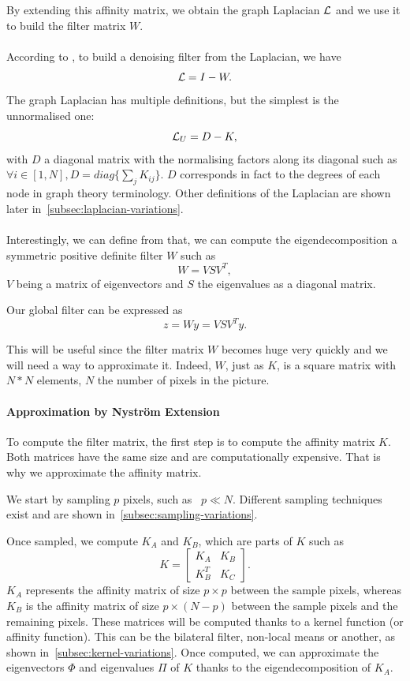 By extending this affinity matrix, we obtain the graph Laplacian \(\operatorname{\mathcal{L}}\) and we use it to build the filter matrix \(W\).

\paragraph{}
According to \cite{modern_tour_2013}, to build a denoising filter from the Laplacian, we have
\[\operatorname{\mathcal{L}} = I - W.\]
The graph Laplacian has multiple definitions, but the simplest is the unnormalised one:
\[\operatorname{\mathcal{L}}_U = D - K,\]
with \(D\) a diagonal matrix with the normalising factors along its diagonal such as \(\forall i \in [1, N], D = diag\{\sum_j K_{ij}\}\).
\(D\) corresponds in fact to the degrees of each node in graph theory terminology.
Other definitions of the Laplacian are shown later in~\ref{subsec:laplacian-variations}.

\paragraph{}
Interestingly, we can define from \cite{glide_2014} that, we can compute the eigendecomposition a symmetric positive definite filter \(W\) such as
\[W = VSV^T,\]
\(V\) being a matrix of eigenvectors and \(S\) the eigenvalues as a diagonal matrix.

Our global filter can be expressed as
\[z = Wy = VSV^Ty.\]

This will be useful since the filter matrix \(W\) becomes huge very quickly and we will need a way to approximate it.
Indeed, \(W\), just as \(K\), is a square matrix with \(N*N\) elements, \(N\) the number of pixels in the picture.

\paragraph{Approximation by Nystr\"om Extension}

To compute the filter matrix, the first step is to compute the affinity matrix \(K\).
Both matrices have the same size and are computationally expensive.
That is why we approximate the affinity matrix.

We start by sampling \(p\) pixels, such as  \(p \ll N\).
Different sampling techniques exist and are shown in~\ref{subsec:sampling-variations}.

Once sampled, we compute \(K_A\) and \(K_B\), which are parts of \(K\) such as
\[
 K = \begin{bmatrix}
  K_A & K_B \\
  K_B^T & K_C
 \end{bmatrix}.
\]
\(K_A\) represents the affinity matrix of size \(p \times p\) between the sample pixels, whereas \(K_B\) is the affinity matrix of size \(p \times (N-p)\) between the sample pixels and the remaining pixels.
These matrices will be computed thanks to a kernel function (or affinity function). This can be the bilateral filter, non-local means or another, as shown in~\ref{subsec:kernel-variations}.
Once computed, we can approximate the eigenvectors \(\Phi\) and eigenvalues \(\Pi\) of \(K\) thanks to the eigendecomposition of \(K_A\).


